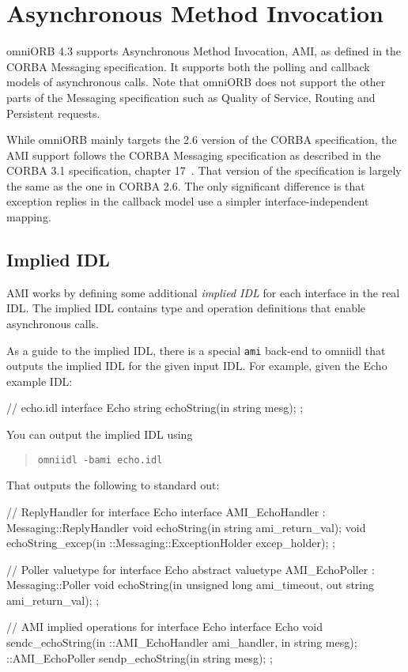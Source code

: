 \documentclass[11pt,oneside,a4paper]{book}
\newcommand{\cmdline}[1]{\texttt{#1}}
\newcommand{\term}[1]{\textit{#1}}
\begin{document}
\chapter{Asynchronous Method Invocation}
\label{chap:ami}

omniORB 4.3 supports Asynchronous Method Invocation, AMI, as defined
in the CORBA Messaging specification. It supports both the polling and
callback models of asynchronous calls. Note that omniORB does not
support the other parts of the Messaging specification such as Quality
of Service, Routing and Persistent requests.

While omniORB mainly targets the 2.6 version of the CORBA
specification, the AMI support follows the CORBA Messaging
specification as described in the CORBA 3.1 specification, chapter
17~\cite{corba31-spec}. That version of the specification is largely
the same as the one in CORBA 2.6. The only significant difference is
that exception replies in the callback model use a simpler
interface-independent mapping.

\section{Implied IDL}

AMI works by defining some additional \term{implied IDL} for each
interface in the real IDL. The implied IDL contains type and
operation definitions that enable asynchronous calls.

As a guide to the implied IDL, there is a special \cmdline{ami}
back-end to omniidl that outputs the implied IDL for the given input
IDL. For example, given the Echo example IDL:

\begin{idllisting}
// echo.idl
interface Echo {
  string echoString(in string mesg);
};
\end{idllisting}

\noindent You can output the implied IDL using

\begin{quote}
\cmdline{omniidl -bami echo.idl}
\end{quote}

\noindent That outputs the following to standard out:

\begin{idllisting}
// ReplyHandler for interface Echo
interface AMI_EchoHandler : Messaging::ReplyHandler {
  void echoString(in string ami_return_val);
  void echoString_excep(in ::Messaging::ExceptionHolder excep_holder);
};

// Poller valuetype for interface Echo
abstract valuetype AMI_EchoPoller : Messaging::Poller {
  void echoString(in unsigned long ami_timeout, out string ami_return_val);
};

// AMI implied operations for interface Echo
interface Echo {
  void sendc_echoString(in ::AMI_EchoHandler ami_handler, in string mesg);
  ::AMI_EchoPoller sendp_echoString(in string mesg);
};
\end{idllisting}
\end{document}
